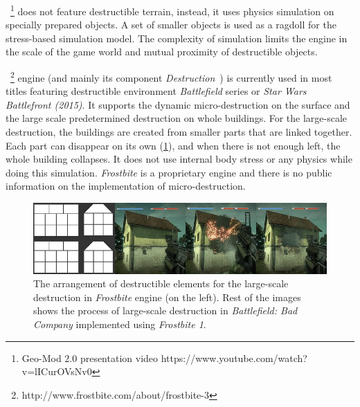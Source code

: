 ~\cite{geomod}\footnote{Geo-Mod 2.0 presentation video https://www.youtube.com/watch?v=lICurOVsNv0} does not feature destructible terrain, instead, it uses physics simulation on specially prepared objects.  A set of smaller objects is used as a ragdoll for the stress-based simulation model. The complexity of simulation  limits the engine in the scale of the game world and mutual proximity of destructible objects. 


~\footnote{http://www.frostbite.com/about/frostbite-3} engine (and mainly its component \emph{Destruction}~\cite{destruction}) is currently used in most titles featuring  destructible environment \eg \emph{Battlefield} series or \emph{Star Wars Battlefront (2015)}. It supports the dynamic micro-destruction on the surface and the large scale predetermined destruction on whole buildings.  For the large-scale destruction, the buildings are created from smaller parts that are linked together. Each part can disappear on its own (\cref{fig:frostbite}), and when there is not enough left, the whole building collapses. It does not use internal body stress or any physics while doing this simulation. \emph{Frostbite} is a proprietary engine and there is no public information on the implementation of micro-destruction. 

\begin{figure}
\centering
\includegraphics[width=\textwidth]{img/frostbite}
\caption{The arrangement of destructible elements for the large-scale destruction in \emph{Frostbite} engine (on the left). Rest of the images shows the process of large-scale destruction in \emph{Battlefield: Bad Company} implemented using \emph{Frostbite 1}.}
\label{fig:frostbite}
\end{figure}

